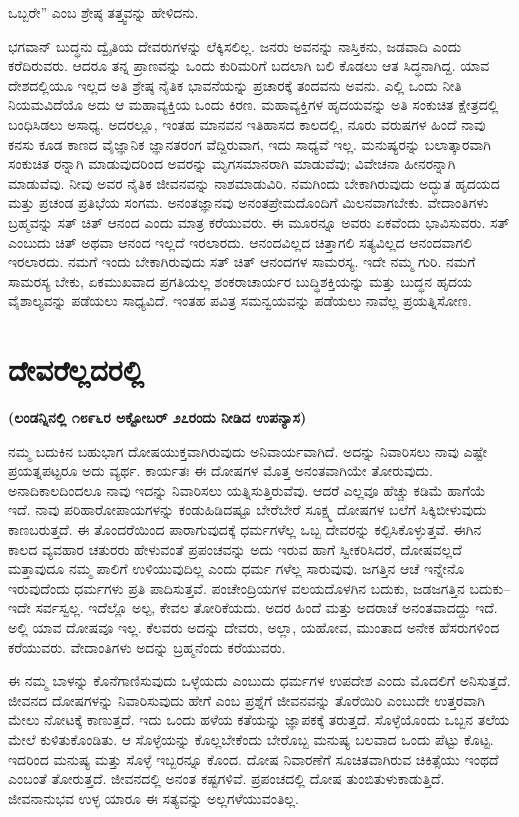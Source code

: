 ಒಬ್ಬರೇ” ಎಂಬ ಶ್ರೇಷ್ಠ ತತ್ತ್ವವನ್ನು ಹೇಳಿದನು.

ಭಗವಾನ್​ ಬುದ್ಧನು ದ್ವೈತಿಯ ದೇವರುಗಳನ್ನು ಲೆಕ್ಕಿಸಲಿಲ್ಲ. ಜನರು ಅವನನ್ನು ನಾಸ್ತಿಕನು, ಜಡವಾದಿ ಎಂದು ಕರೆದಿರುವರು. ಆದರೂ ತನ್ನ ಪ್ರಾಣವನ್ನು ಒಂದು ಕುರಿಮರಿಗೆ ಬದಲಾಗಿ ಬಲಿ ಕೊಡಲು ಆತ ಸಿದ್ಧನಾಗಿದ್ದ. ಯಾವ ದೇಶದಲ್ಲಿಯೂ ಇಲ್ಲದ ಅತಿ ಶ್ರೇಷ್ಠ ನೈತಿಕ ಭಾವನೆಯನ್ನು ಪ್ರಚಾರಕ್ಕೆ ತಂದವನು ಅವನು. ಎಲ್ಲಿ ಒಂದು ನೀತಿ ನಿಯಮವಿದೆಯೊ ಅದು ಆ ಮಹಾವ್ಯಕ್ತಿಯ ಒಂದು ಕಿರಣ. ಮಹಾವ್ಯಕ್ತಿಗಳ ಹೃದಯವನ್ನು ಅತಿ ಸಂಕುಚಿತ ಕ್ಷೇತ್ರದಲ್ಲಿ ಬಂಧಿಸಿಡಲು ಅಸಾಧ್ಯ. ಅದರಲ್ಲೂ, ಇಂತಹ ಮಾನವನ ಇತಿಹಾಸದ ಕಾಲದಲ್ಲಿ, ನೂರು ವರುಷಗಳ ಹಿಂದೆ ನಾವು ಕನಸು ಕೂಡ ಕಾಣದ ವೈಜ್ಞಾನಿಕ ಜ್ಞಾನತರಂಗ ವೆದ್ದಿರುವಾಗ, ಇದು ಸಾಧ್ಯವೆ ಇಲ್ಲ. ಮನುಷ್ಯರನ್ನು ಬಲಾತ್ಕಾರವಾಗಿ ಸಂಕುಚಿತ ರನ್ನಾಗಿ ಮಾಡುವುದರಿಂದ ಅವರನ್ನು ಮೃಗಸಮಾನರಾಗಿ ಮಾಡುವೆವು; ವಿವೇಚನಾ ಹೀನರನ್ನಾಗಿ ಮಾಡುವೆವು. ನೀವು ಅವರ ನೈತಿಕ ಜೀವನವನ್ನು ನಾಶಮಾಡುವಿರಿ. ನಮಗಿಂದು ಬೇಕಾಗಿರುವುದು ಅದ್ಭುತ ಹೃದಯದ ಮತ್ತು ಪ್ರಚಂಡ ಪ್ರತಿಭೆಯ ಸಂಗಮ. ಅನಂತಜ್ಞಾನವು ಅನಂತಪ್ರೇಮದೊಂದಿಗೆ ಮಿಲನವಾಗಬೇಕು. ವೇದಾಂತಿಗಳು ಬ್ರಹ್ಮವನ್ನು ಸತ್​ ಚಿತ್​ ಆನಂದ ಎಂದು ಮಾತ್ರ ಕರೆಯುವರು. ಈ ಮೂರನ್ನೂ ಅವರು ಏಕವೆಂದು ಭಾವಿಸುವರು. ಸತ್​ ಎಂಬುದು ಚಿತ್​ ಅಥವಾ ಆನಂದ ಇಲ್ಲದೆ ಇರಲಾರದು. ಆನಂದವಿಲ್ಲದ ಚಿತ್ತಾಗಲಿ ಸತ್ಯವಿಲ್ಲದ ಆನಂದವಾಗಲಿ ಇರಲಾರದು. ನಮಗೆ ಇಂದು ಬೇಕಾಗಿರುವುದು ಸತ್​ ಚಿತ್​ ಆನಂದಗಳ ಸಾಮರಸ್ಯ. ಇದೇ ನಮ್ಮ ಗುರಿ. ನಮಗೆ ಸಾಮರಸ್ಯ ಬೇಕು, ಏಕಮುಖವಾದ ಪ್ರಗತಿಯಲ್ಲ ಶಂಕರಾಚಾರ್ಯರ ಬುದ್ಧಿಶಕ್ತಿಯನ್ನು ಮತ್ತು ಬುದ್ಧನ ಹೃದಯ ವೈಶಾಲ್ಯವನ್ನು ಪಡೆಯಲು ಸಾಧ್ಯವಿದೆ. ಇಂತಹ ಪವಿತ್ರ ಸಮನ್ವಯವನ್ನು ಪಡೆಯಲು ನಾವೆಲ್ಲ ಪ್ರಯತ್ನಿಸೋಣ.

\delimiter

\chapter{ದೇವರೆಲ್ಲದರಲ್ಲಿ}

\centerline{\textbf{(ಲಂಡನ್ನಿನಲ್ಲಿ ೧೮೯೬ರ ಅಕ್ಟೋಬರ್​ ೨೭ರಂದು ನೀಡಿದ ಉಪನ್ಯಾಸ)}}

ನಮ್ಮ ಬದುಕಿನ ಬಹುಭಾಗ ದೋಷಯುಕ್ತವಾಗಿರುವುದು ಅನಿವಾರ್ಯವಾಗಿದೆ. ಅದನ್ನು ನಿವಾರಿಸಲು ನಾವು ಎಷ್ಟೇ ಪ್ರಯತ್ನಪಟ್ಟರೂ ಅದು ವ್ಯರ್ಥ. ಕಾರ್ಯತಃ ಈ ದೋಷಗಳ ಮೊತ್ತ ಅನಂತವಾಗಿಯೇ ತೋರುವುದು. ಅನಾದಿಕಾಲದಿಂದಲೂ ನಾವು ಇದನ್ನು ನಿವಾರಿಸಲು ಯತ್ನಿಸುತ್ತಿರುವೆವು. ಆದರೆ ಎಲ್ಲವೂ ಹೆಚ್ಚು ಕಡಿಮೆ ಹಾಗೆಯೆ ಇದೆ. ನಾವು ಪರಿಹಾರೋಪಾಯಗಳನ್ನು ಕಂಡುಹಿಡಿದಷ್ಟೂ ಬೇರೆಬೇರೆ ಸೂಕ್ಷ್ಮ ದೋಷಗಳ ಬಲೆಗೆ ಸಿಕ್ಕಿಬೀಳುವುದು ಕಾಣಬರುತ್ತದೆ. ಈ ತೊಂದರೆಯಿಂದ ಪಾರಾಗುವುದಕ್ಕೆ ಧರ್ಮಗಳೆಲ್ಲ ಒಬ್ಬ ದೇವರನ್ನು ಕಲ್ಪಿಸಿಕೊಳ್ಳುತ್ತವೆ. ಈಗಿನ ಕಾಲದ ವ್ಯವಹಾರ ಚತುರರು ಹೇಳುವಂತೆ ಪ್ರಪಂಚವನ್ನು ಅದು ಇರುವ ಹಾಗೆ ಸ್ವೀಕರಿಸಿದರೆ, ದೋಷವಲ್ಲದೆ ಮತ್ತಾವುದೂ ನಮ್ಮ ಪಾಲಿಗೆ ಉಳಿಯುವುದಿಲ್ಲ ಎಂದು ಧರ್ಮ ಗಳೆಲ್ಲ ಸಾರುವುವು. ಜಗತ್ತಿನ ಆಚೆ ಇನ್ನೇನೊ ಇರುವುದೆಂದು ಧರ್ಮಗಳು ಪ್ರತಿ ಪಾದಿಸುತ್ತವೆ. ಪಂಚೇಂದ್ರಿಯಗಳ ವಲಯದೊಳಗಿನ ಬದುಕು, ಜಡಜಗತ್ತಿನ ಬದುಕು–ಇದೇ ಸರ್ವಸ್ವಲ್ಲ. ಇದೆಲ್ಲೊ ಅಲ್ಪ, ಕೇವಲ ತೋರಿಕೆಯದು. ಅದರ ಹಿಂದೆ ಮತ್ತು ಅದರಾಚೆ ಅನಂತವಾದದ್ದು ಇದೆ. ಅಲ್ಲಿ ಯಾವ ದೋಷವೂ ಇಲ್ಲ. ಕೆಲವರು ಅದನ್ನು ದೇವರು, ಅಲ್ಲಾ, ಯಹೋವ, ಮುಂತಾದ ಅನೇಕ ಹೆಸರುಗಳಿಂದ ಕರೆಯುವರು. ವೇದಾಂತಿಗಳು ಅದನ್ನು ಬ್ರಹ್ಮನೆಂದು ಕರೆಯುವರು.

ಈ ನಮ್ಮ ಬಾಳನ್ನು ಕೊನೆಗಾಣಿಸುವುದು ಒಳ್ಳೆಯದು ಎಂಬುದು ಧರ್ಮಗಳ ಉಪದೇಶ ಎಂದು ಮೊದಲಿಗೆ ಅನಿಸುತ್ತದೆ. ಜೀವನದ ದೋಷಗಳನ್ನು ನಿವಾರಿಸುವುದು ಹೇಗೆ ಎಂಬ ಪ್ರಶ್ನೆಗೆ ಜೀವನವನ್ನು ತೊರೆಯಿರಿ ಎಂಬುದೇ ಉತ್ತರವಾಗಿ ಮೇಲು ನೋಟಕ್ಕೆ ಕಾಣುತ್ತದೆ. ಇದು ಒಂದು ಹಳೆಯ ಕತೆಯನ್ನು ಜ್ಞಾಪಕಕ್ಕೆ ತರುತ್ತದೆ. ಸೊಳ್ಳೆಯೊಂದು ಒಬ್ಬನ ತಲೆಯ ಮೇಲೆ ಕುಳಿತುಕೊಂಡಿತು. ಆ ಸೊಳ್ಳೆಯನ್ನು ಕೊಲ್ಲಬೇಕೆಂದು ಬೇರೊಬ್ಬ ಮನುಷ್ಯ ಬಲವಾದ ಒಂದು ಪೆಟ್ಟು ಕೊಟ್ಟ. ಇದರಿಂದ ಮನುಷ್ಯ ಮತ್ತು ಸೊಳ್ಳೆ ಇಬ್ಬರನ್ನೂ ಕೊಂದ. ದೋಷ ನಿವಾರಣೆಗೆ ಸೂಚಿತವಾಗಿರುವ ಚಿಕಿತ್ಸೆಯು ಇಂಥದೆ ಎಂಬಂತೆ ತೋರುತ್ತದೆ. ಜೀವನದಲ್ಲಿ ಅನಂತ ಕಷ್ಟಗಳಿವೆ. ಪ್ರಪಂಚದಲ್ಲಿ ದೋಷ ತುಂಬಿತುಳುಕಾಡುತ್ತಿದೆ. ಜೀವನಾನುಭವ ಉಳ್ಳ ಯಾರೂ ಈ ಸತ್ಯವನ್ನು ಅಲ್ಲಗಳೆಯುವಂತಿಲ್ಲ.

